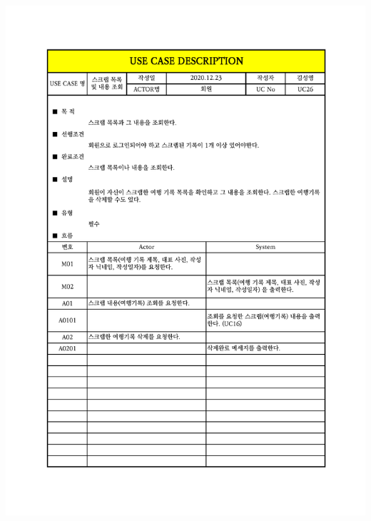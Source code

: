 {{{{{{{{{{{{{{{{{{{{{{{{{{{{\includegraphics[width=1.1\textwidth]{./Figure/Design/Display/usecase/026.pdf} \\
}}}}}}}}}}}}}}}}}}}}}}}}}}}}
